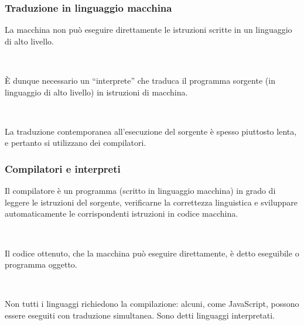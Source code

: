 \documentclass[]{beamer}
\begin{document}
\begin{frame}
\frametitle{Traduzione in linguaggio macchina}
La macchina non può eseguire direttamente le istruzioni scritte in un linguaggio di alto livello.\pause

~

È dunque necessario un ``interprete'' che traduca il \alert<2>{programma sorgente} (in linguaggio di alto livello) in istruzioni di macchina.\pause

~

La traduzione contemporanea all'esecuzione del sorgente è spesso piuttosto lenta, e pertanto si utilizzano dei \alert<3>{compilatori}.
\end{frame}



\begin{frame}
\frametitle{Compilatori e interpreti}
Il compilatore è un programma (scritto in linguaggio macchina) in grado di leggere le istruzioni del sorgente, verificarne la correttezza linguistica e \alert<1>{sviluppare automaticamente le corrispondenti istruzioni in codice macchina}.\pause

~

Il codice ottenuto, che la macchina può eseguire direttamente, è detto \alert<2>{eseguibile} o \alert<2>{programma oggetto}.\pause
  
~

Non tutti i linguaggi richiedono la compilazione: alcuni, come JavaScript, possono essere eseguiti con traduzione simultanea. Sono detti \alert<3>{linguaggi interpretati}.
\end{frame}
\end{document}
